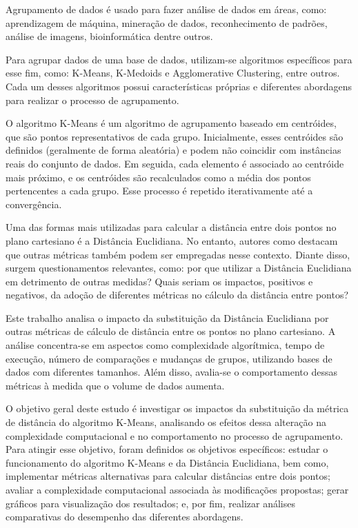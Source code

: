 \documentclass[10pt,a4paper,twocolumn]{article}
\begin{document}
Agrupamento de dados é usado para fazer análise de dados em áreas, como: aprendizagem de máquina, mineração de dados, reconhecimento de padrões, análise de imagens, bioinformática dentre outros.\cite{Ferrari2016}

Para agrupar dados de uma base de dados, utilizam-se algoritmos específicos para esse fim, como: K-Means, K-Medoids e Agglomerative Clustering, entre outros. Cada um desses algoritmos possui características próprias e diferentes abordagens para realizar o processo de agrupamento.

O algoritmo K-Means é um algoritmo de agrupamento baseado em centróides, que são pontos representativos de cada grupo. Inicialmente, esses centróides são definidos (geralmente de forma aleatória) e podem não coincidir com instâncias reais do conjunto de dados. Em seguida, cada elemento é associado ao centróide mais próximo, e os centróides são recalculados como a média dos pontos pertencentes a cada grupo. Esse processo é repetido iterativamente até a convergência.\cite{AMARAL2019}

Uma das formas mais utilizadas para calcular a distância entre dois pontos no plano cartesiano é a Distância Euclidiana. No entanto, autores como \cite{AMARAL2019} destacam que outras métricas também podem ser empregadas nesse contexto. Diante disso, surgem questionamentos relevantes, como: por que utilizar a Distância Euclidiana em detrimento de outras medidas? Quais seriam os impactos, positivos e negativos, da adoção de diferentes métricas no cálculo da distância entre pontos?

Este trabalho analisa o impacto da substituição da Distância Euclidiana por outras métricas de cálculo de distância entre os pontos no plano cartesiano. A análise concentra-se em aspectos como complexidade algorítmica, tempo de execução, número de comparações e mudanças de grupos, utilizando bases de dados com diferentes tamanhos. Além disso, avalia-se o comportamento dessas métricas à medida que o volume de dados aumenta.


O objetivo geral deste estudo é investigar os impactos da substituição da métrica de distância do algoritmo K-Means, analisando os efeitos dessa alteração na complexidade computacional e no comportamento no processo de agrupamento. Para atingir esse objetivo, foram definidos os objetivos específicos: estudar o funcionamento do algoritmo K-Means e da Distância Euclidiana, bem como, implementar métricas alternativas para calcular distâncias entre dois pontos; avaliar a complexidade computacional associada às modificações propostas; gerar gráficos para visualização dos resultados; e, por fim, realizar análises comparativas do desempenho das diferentes abordagens.
\end{document}
